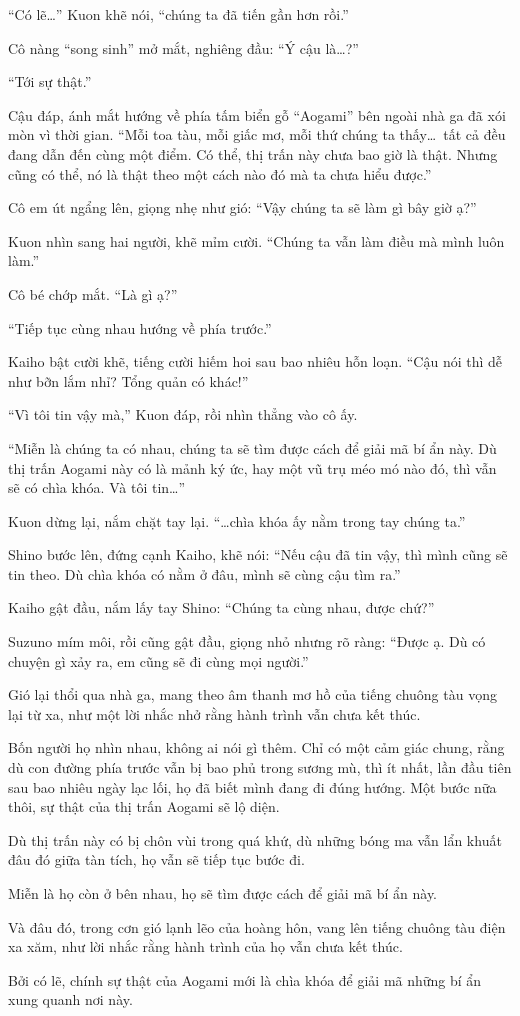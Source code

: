 \documentclass[../main.tex]{subfiles}
\begin{document}
``Có lẽ\dots'' Kuon khẽ nói,  ``chúng ta đã tiến gần hơn rồi.''

Cô nàng ``song sinh'' mở mắt, nghiêng đầu: ``Ý cậu là\dots?''

``Tới sự thật.''

Cậu đáp, ánh mắt hướng về phía tấm biển gỗ ``Aogami'' bên ngoài nhà ga đã xói mòn vì thời gian.  ``Mỗi toa tàu, mỗi giấc mơ, mỗi thứ chúng ta thấy\dots\ tất cả đều đang dẫn đến cùng một điểm. Có thể, thị trấn này chưa bao giờ là thật. Nhưng cũng có thể, nó là thật theo một cách nào đó mà ta chưa hiểu được.''

Cô em út ngẩng lên, giọng nhẹ như gió: ``Vậy chúng ta sẽ làm gì bây giờ ạ?''

Kuon nhìn sang hai người, khẽ mỉm cười. ``Chúng ta vẫn làm điều mà mình luôn làm.''

Cô bé chớp mắt. ``Là gì ạ?''

``Tiếp tục cùng nhau hướng về phía trước.''

Kaiho bật cười khẽ, tiếng cười hiếm hoi sau bao nhiêu hỗn loạn. ``Cậu nói thì dễ như bỡn lắm nhỉ? Tổng quản có khác!''

``Vì tôi tin vậy mà,'' Kuon đáp, rồi nhìn thẳng vào cô ấy.

``Miễn là chúng ta có nhau, chúng ta sẽ tìm được cách để giải mã bí ẩn này. Dù thị trấn Aogami này có là mảnh ký ức, hay một vũ trụ méo mó nào đó, thì vẫn sẽ có chìa khóa. Và tôi tin\dots''

Kuon dừng lại, nắm chặt tay lại. ``\dots chìa khóa ấy nằm trong tay chúng ta.''

Shino bước lên, đứng cạnh Kaiho, khẽ nói: ``Nếu cậu đã tin vậy, thì mình cũng sẽ tin theo. Dù chìa khóa có nằm ở đâu, mình sẽ cùng cậu tìm ra.''

Kaiho gật đầu, nắm lấy tay Shino: ``Chúng ta cùng nhau, được chứ?''

Suzuno mím môi, rồi cũng gật đầu, giọng nhỏ nhưng rõ ràng: ``Được ạ. Dù có chuyện gì xảy ra, em cũng sẽ đi cùng mọi người.''

Gió lại thổi qua nhà ga, mang theo âm thanh mơ hồ của tiếng chuông tàu vọng lại từ xa, như một lời nhắc nhở rằng hành trình vẫn chưa kết thúc.

Bốn người họ nhìn nhau, không ai nói gì thêm. Chỉ có một cảm giác chung, rằng dù con đường phía trước vẫn bị bao phủ trong sương mù, thì ít nhất, lần đầu tiên sau bao nhiêu ngày lạc lối, họ đã biết mình đang đi đúng hướng.
Một bước nữa thôi, sự thật của thị trấn Aogami sẽ lộ diện.

Dù thị trấn này có bị chôn vùi trong quá khứ, dù những bóng ma vẫn lẩn khuất đâu đó giữa tàn tích, họ vẫn sẽ tiếp tục bước đi.

Miễn là họ còn ở bên nhau, họ sẽ tìm được cách để giải mã bí ẩn này.

Và đâu đó, trong cơn gió lạnh lẽo của hoàng hôn, vang lên tiếng chuông tàu điện xa xăm, như lời nhắc rằng hành trình của họ vẫn chưa kết thúc.

Bởi có lẽ, chính sự thật của Aogami mới là chìa khóa để giải mã những bí ẩn xung quanh nơi này.
\end{document}
